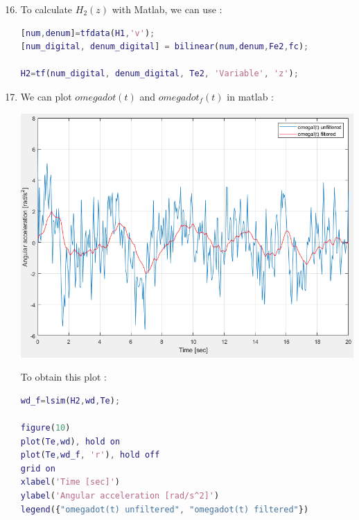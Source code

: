 \documentclass[a4paper,12pt]{article}
\begin{document}
\begin{enumerate}[label={\color{blue}\arabic*)}]
    \setcounter{enumi}{15}

    \item
    To calculate \(H_2(z)\) with Matlab, we can use :
    \begin{lstlisting}[style=Matlab-editor,language=Matlab, basicstyle=\small\ttfamily]
[num,denum]=tfdata(H1,'v');
[num_digital, denum_digital] = bilinear(num,denum,Fe2,fc);

H2=tf(num_digital, denum_digital, Te2, 'Variable', 'z');
        \end{lstlisting}

    \item
    We can plot \(omega dot(t)\) and \(omega dot_f(t)\) in matlab :
    \begin{multicols}{2}
    \begin{flushleft}
            \includegraphics[width=1\linewidth]{Images/omega_dot_filtered.png}
            \label{Figure13}
        \end{flushleft}
    \columnbreak
    To obtain this plot :
    \begin{lstlisting}[style=Matlab-editor,language=Matlab, basicstyle=\small\ttfamily]
wd_f=lsim(H2,wd,Te);

figure(10)
plot(Te,wd), hold on
plot(Te,wd_f, 'r'), hold off
grid on
xlabel('Time [sec]')
ylabel('Angular acceleration [rad/s^2]')
legend({"omegadot(t) unfiltered", "omegadot(t) filtered"})
        \end{lstlisting}


\end{multicols}
\end{enumerate}
\end{document}
